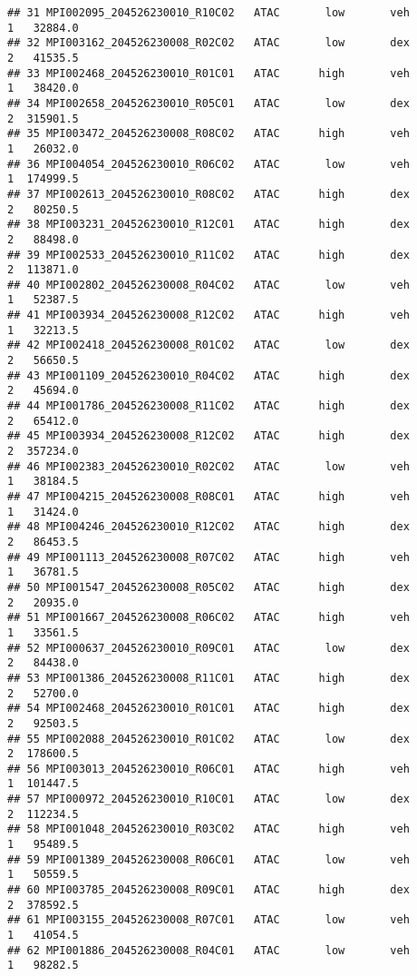 \documentclass[
]{article}
\begin{document}
\begin{verbatim}
## 31 MPI002095_204526230010_R10C02   ATAC       low       veh         1   32884.0
## 32 MPI003162_204526230008_R02C02   ATAC       low       dex         2   41535.5
## 33 MPI002468_204526230010_R01C01   ATAC      high       veh         1   38420.0
## 34 MPI002658_204526230010_R05C01   ATAC       low       dex         2  315901.5
## 35 MPI003472_204526230008_R08C02   ATAC      high       veh         1   26032.0
## 36 MPI004054_204526230010_R06C02   ATAC       low       veh         1  174999.5
## 37 MPI002613_204526230010_R08C02   ATAC      high       dex         2   80250.5
## 38 MPI003231_204526230010_R12C01   ATAC      high       dex         2   88498.0
## 39 MPI002533_204526230010_R11C02   ATAC      high       dex         2  113871.0
## 40 MPI002802_204526230008_R04C02   ATAC       low       veh         1   52387.5
## 41 MPI003934_204526230008_R12C02   ATAC      high       veh         1   32213.5
## 42 MPI002418_204526230008_R01C02   ATAC       low       dex         2   56650.5
## 43 MPI001109_204526230010_R04C02   ATAC      high       dex         2   45694.0
## 44 MPI001786_204526230008_R11C02   ATAC      high       dex         2   65412.0
## 45 MPI003934_204526230008_R12C02   ATAC      high       dex         2  357234.0
## 46 MPI002383_204526230010_R02C02   ATAC       low       veh         1   38184.5
## 47 MPI004215_204526230008_R08C01   ATAC      high       veh         1   31424.0
## 48 MPI004246_204526230010_R12C02   ATAC      high       dex         2   86453.5
## 49 MPI001113_204526230008_R07C02   ATAC      high       veh         1   36781.5
## 50 MPI001547_204526230008_R05C02   ATAC      high       dex         2   20935.0
## 51 MPI001667_204526230008_R06C02   ATAC      high       veh         1   33561.5
## 52 MPI000637_204526230010_R09C01   ATAC       low       dex         2   84438.0
## 53 MPI001386_204526230008_R11C01   ATAC      high       dex         2   52700.0
## 54 MPI002468_204526230010_R01C01   ATAC      high       dex         2   92503.5
## 55 MPI002088_204526230010_R01C02   ATAC       low       dex         2  178600.5
## 56 MPI003013_204526230010_R06C01   ATAC      high       veh         1  101447.5
## 57 MPI000972_204526230010_R10C01   ATAC       low       dex         2  112234.5
## 58 MPI001048_204526230010_R03C02   ATAC      high       veh         1   95489.5
## 59 MPI001389_204526230008_R06C01   ATAC       low       veh         1   50559.5
## 60 MPI003785_204526230008_R09C01   ATAC      high       dex         2  378592.5
## 61 MPI003155_204526230008_R07C01   ATAC       low       veh         1   41054.5
## 62 MPI001886_204526230008_R04C01   ATAC       low       veh         1   98282.5

\end{verbatim}
\end{document}

